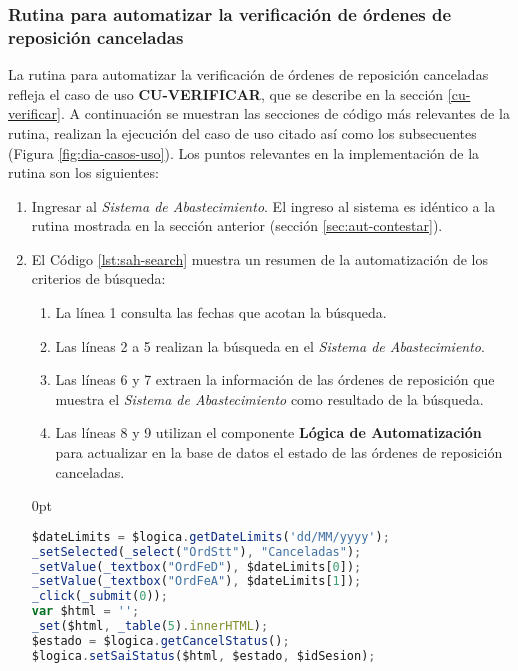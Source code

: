 \subsubsection{Rutina para automatizar la verificación de órdenes de reposición canceladas}
La rutina para automatizar la verificación de órdenes de reposición canceladas refleja el caso de uso \textbf{CU-VERIFICAR}, que se describe en la sección \ref{cu-verificar}. A continuación se muestran las secciones de código más relevantes de la rutina, realizan la ejecución del caso de uso citado así como los subsecuentes (Figura \ref{fig:dia-casos-uso}). Los puntos relevantes en la implementación de la rutina son los siguientes:
\begin{enumerate}
	\item Ingresar al \textit{Sistema de Abastecimiento}. El ingreso al sistema es idéntico a la rutina mostrada en la sección anterior (sección \ref{sec:aut-contestar}).

	\item El Código \ref{lst:sah-search} muestra un resumen de la automatización de los criterios de búsqueda:
	\begin{enumerate}
		\item La línea 1 consulta las fechas que acotan la búsqueda.
		\item Las líneas 2 a 5 realizan la búsqueda en el \textit{Sistema de Abastecimiento}.
		\item Las líneas 6 y 7 extraen la información de las órdenes de reposición que muestra el \textit{Sistema de Abastecimiento} como resultado de la búsqueda.
		\item Las líneas 8 y 9 utilizan el componente \textbf{Lógica de Automatización} para actualizar en la base de datos el estado de las órdenes de reposición canceladas.
	\end{enumerate}
	\begin{adjustwidth}{\listingfixwidth}{0pt}
	\begin{lstlisting}[language=Javascript, caption={Responder orden de reposición.}, captionpos=b, label={lst:sah-search}]
$dateLimits = $logica.getDateLimits('dd/MM/yyyy');
_setSelected(_select("OrdStt"), "Canceladas");
_setValue(_textbox("OrdFeD"), $dateLimits[0]);
_setValue(_textbox("OrdFeA"), $dateLimits[1]);
_click(_submit(0));
var $html = '';
_set($html, _table(5).innerHTML);
$estado = $logica.getCancelStatus();
$logica.setSaiStatus($html, $estado, $idSesion);
	\end{lstlisting}
	\end{adjustwidth}
\end{enumerate}

